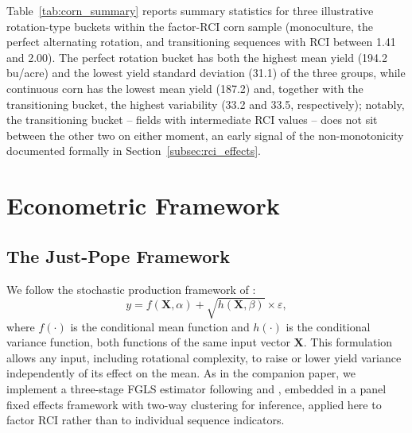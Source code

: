 \documentclass[12pt,letterpaper]{article}
\theoremstyle{remark}
\theoremstyle{remark}
\theoremstyle{plain}
\theoremstyle{definition}
\begin{document}

\vspace{-1ex}

Table~\ref{tab:corn_summary} reports summary statistics for three illustrative rotation-type buckets within the factor-RCI corn sample (monoculture, the perfect alternating rotation, and transitioning sequences with RCI between 1.41 and 2.00). The perfect rotation bucket has both the highest mean yield (194.2 bu/acre) and the lowest yield standard deviation (31.1) of the three groups, while continuous corn has the lowest mean yield (187.2) and, together with the transitioning bucket, the highest variability (33.2 and 33.5, respectively); notably, the transitioning bucket -- fields with intermediate RCI values -- does not sit between the other two on either moment, an early signal of the non-monotonicity documented formally in Section~\ref{subsec:rci_effects}.

\section{Econometric Framework\label{sec:econ_framework}}

\subsection{\label{subsec:just_pope}The Just-Pope Framework}
We follow the stochastic production framework of \citet{Just1978, Just1979}:
\begin{equation}
    y = f(\mathbf{X},\alpha)+\sqrt{h(\mathbf{X},\beta)}\times \varepsilon,
\end{equation}
where $f(\cdot)$ is the conditional mean function and $h(\cdot)$ is the conditional variance function, both functions of the same input vector $\mathbf{X}$. This formulation allows any input, including rotational complexity, to raise or lower yield variance independently of its effect on the mean. As in the companion paper, we implement a three-stage FGLS estimator following \citet{Harvey1976} and \citet{Saha1997}, embedded in a panel fixed effects framework with two-way clustering for inference, applied here to factor RCI rather than to individual sequence indicators.
\end{document}
